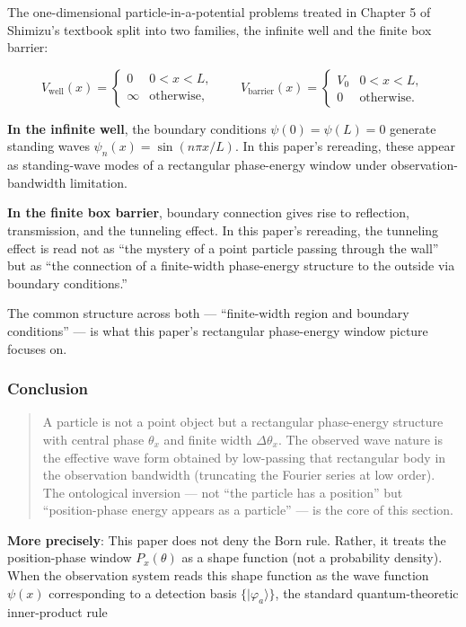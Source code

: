 \documentclass[
]{article}
\begin{document}
The one-dimensional particle-in-a-potential problems treated in Chapter
5 of Shimizu's textbook split into two families, the infinite well and
the finite box barrier:

\[
V_{\mathrm{well}}(x) = \begin{cases}
0 & 0 < x < L, \\
\infty & \text{otherwise},
\end{cases}
\qquad
V_{\mathrm{barrier}}(x) = \begin{cases}
V_0 & 0 < x < L, \\
0 & \text{otherwise}.
\end{cases}
\]

\textbf{In the infinite well}, the boundary conditions
\(\psi(0) = \psi(L) = 0\) generate standing waves
\(\psi_n(x) = \sin(n\pi x / L)\). In this paper's rereading, these
appear as standing-wave modes of a rectangular phase-energy window under
observation-bandwidth limitation.

\textbf{In the finite box barrier}, boundary connection gives rise to
reflection, transmission, and the tunneling effect. In this paper's
rereading, the tunneling effect is read not as ``the mystery of a point
particle passing through the wall'' but as ``the connection of a
finite-width phase-energy structure to the outside via boundary
conditions.''

The common structure across both --- ``finite-width region and boundary
conditions'' --- is what this paper's rectangular phase-energy window
picture focuses on.

\subsubsection{Conclusion}\label{conclusion-6}

\begin{quote}
A particle is not a point object but a rectangular phase-energy
structure with central phase \(\theta_x\) and finite width
\(\Delta\theta_x\). The observed wave nature is the effective wave form
obtained by low-passing that rectangular body in the observation
bandwidth (truncating the Fourier series at low order). The ontological
inversion --- not ``the particle has a position'' but ``position-phase
energy appears as a particle'' --- is the core of this section.
\end{quote}

\textbf{More precisely}: This paper does not deny the Born rule. Rather,
it treats the position-phase window \(P_x(\theta)\) as a shape function
(not a probability density). When the observation system reads this
shape function as the wave function \(\psi(x)\) corresponding to a
detection basis \(\{|\varphi_a\rangle\}\), the standard
quantum-theoretic inner-product rule
\end{document}
